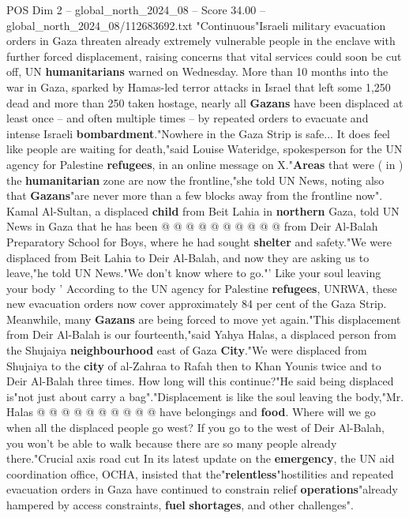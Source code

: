 \begin{textsample}{POS Dim 2 – global\_north\_2024\_08 – Score 34.00 – global\_north\_2024\_08/112683692.txt}  \label{ex:f2_pos_391}
"Continuous"Israeli military evacuation orders in Gaza threaten already extremely vulnerable people in the enclave with further forced displacement, raising concerns that vital services could soon be cut off, UN \textbf{humanitarians} warned on Wednesday.
More than 10 months into the war in Gaza, sparked by Hamas-led terror attacks in Israel that left some 1,250 dead and more than 250 taken hostage, nearly all \textbf{Gazans} have been displaced at least once -- and often multiple times -- by repeated orders to evacuate and intense Israeli \textbf{bombardment}."Nowhere in the Gaza Strip is safe...
It does feel like people are waiting for death,"said Louise Wateridge, spokesperson for the UN agency for Palestine \textbf{refugees}, in an online message on X."\textbf{Areas} that were ( in ) the \textbf{humanitarian} zone are now the frontline,"she told UN News, noting also that \textbf{Gazans}"are never more than a few blocks away from the frontline now".
Kamal Al-Sultan, a displaced \textbf{child} from Beit Lahia in \textbf{northern} Gaza, told UN News in Gaza that he has been @ @ @ @ @ @ @ @ @ @ from Deir Al-Balah Preparatory School for Boys, where he had sought \textbf{shelter} and safety."We were displaced from Beit Lahia to Deir Al-Balah, and now they are asking us to leave,"he told UN News."We don't know where to go."' Like your soul leaving your body ' According to the UN agency for Palestine \textbf{refugees}, UNRWA, these new evacuation orders now cover approximately 84 per cent of the Gaza Strip.
Meanwhile, many \textbf{Gazans} are being forced to move yet again."This displacement from Deir Al-Balah is our fourteenth,"said Yahya Halas, a displaced person from the Shujaiya \textbf{neighbourhood} east of Gaza \textbf{City}."We were displaced from Shujaiya to the \textbf{city} of al-Zahraa to Rafah then to Khan Younis twice and to Deir Al-Balah three times.
How long will this continue?"He said being displaced is"not just about carry a bag"."Displacement is like the soul leaving the body,"Mr.
Halas @ @ @ @ @ @ @ @ @ @ have belongings and \textbf{food}.
Where will we go when all the displaced people go west?
If you go to the west of Deir Al-Balah, you won't be able to walk because there are so many people already there."Crucial axis road cut In its latest update on the \textbf{emergency}, the UN aid coordination office, OCHA, insisted that the"\textbf{relentless}"hostilities and repeated evacuation orders in Gaza have continued to constrain relief \textbf{operations}"already hampered by access constraints, \textbf{fuel} \textbf{shortages}, and other challenges".

\end{textsample}
